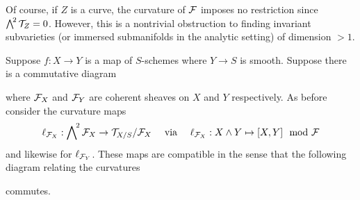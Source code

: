 \documentclass[main.tex]{subfiles}
\begin{document}
Of course, if $Z$ is a curve, the curvature of $\mathcal{F}$ imposes no restriction since $\bigwedge\nolimits^{\! 2} \mathcal{T}_Z = 0$. However, this is a nontrivial obstruction to finding invariant subvarieties (or immersed submanifolds in the analytic setting) of dimension $> 1$. 

\begin{prop} \label{prop:curvature_pullback_compatibility}
Suppose $f : X \to Y$ is a map of $S$-schemes where $Y \to S$ is smooth. Suppose there is a commutative diagram
\begin{center}
\end{center}
where $\mathcal{F}_X$ and $\mathcal{F}_Y$ are coherent sheaves on $X$ and $Y$ respectively. As before consider the curvature maps
\[ \ell_{\mathcal{F}_{X}} : \bigwedge\nolimits^{\! 2} \mathcal{F}_X \to \mathcal{T}_{X/S} / \mathcal{F}_X  \quad \text{ via } \quad \ell_{\mathcal{F}_X} : X \wedge Y \mapsto [X,Y] \mod {\mathcal{F}} \] 
and likewise for $\ell_{\mathcal{F}_{Y}}$. These maps are compatible in the sense that the following diagram relating the curvatures
\begin{center}
\end{center}
commutes.
\end{prop}
\end{document}
